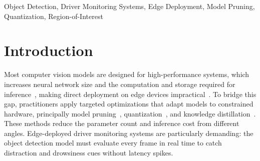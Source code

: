 \documentclass[conference]{IEEEtran}
\begin{document}
\begin{abstract}
Edge-deployed driver monitoring systems (DMS) must detect distraction and drowsiness cues in real time under strict latency, memory, and power budgets, yet most object detectors are designed for high-performance hardware. We study this gap through a three-phase evaluation of nano-scale YOLO detectors on the Driver Monitoring Dataset (DMD), using a subject-disjoint 8:3:3 split, four driver-behavior classes, and macro-recall as the primary safety metric. Phase~I evaluates structured $\ell_1$-norm channel pruning (10--90\% sparsity) combined with INT8 post-training quantization (PTQ) and quantization-aware training (QAT). YOLO11n remains within the 5-pp safety recall floor up to 70\% pruning (85.6\% vs.\ 86.4\% baseline), whereas YOLO26n holds only up to 60\%; in single-seed runs, PTQ INT8 preserves recall at 70\% sparsity. Phase~II compares a static central $400\times400$ crop with a $640\times640$ overlapping collage across input resolutions from $640\times640$ down to $80\times80$. The $320\times320$ crop gives the best trade-off, matching the full-frame macro-F1 at one quarter of the GFLOPs. Phase~III co-designs a 70\%-pruned, PTQ INT8 YOLO11n on a $320\times320$ cropped input requires 0.614~GFLOPs and 1.19~MB, a $10.6\times$ compute and $4.4\times$ storage reduction, at 92\% of the baseline macro-recall. Our results show that DMS object detection can be made more compute efficient through model-side and input-side optimization at a marginal recall loss.
\end{abstract}

\begin{IEEEkeywords}
Object Detection, Driver Monitoring Systems, Edge Deployment, Model Pruning, Quantization, Region-of-Interest
\end{IEEEkeywords}


\section{Introduction}
Most computer vision models are designed for high-performance systems, which increases neural network size and the computation and storage required for inference~\cite{b1}, making direct deployment on edge devices impractical~\cite{b2,b3}. To bridge this gap, practitioners apply targeted optimizations that adapt models to constrained hardware, principally model pruning~\cite{b4}, quantization~\cite{b5}, and knowledge distillation~\cite{b6}. These methods reduce the parameter count and inference cost from different angles. Edge-deployed driver monitoring systems are particularly demanding: the object detection model must evaluate every frame in real time to catch distraction and drowsiness cues without latency spikes.
\end{document}
